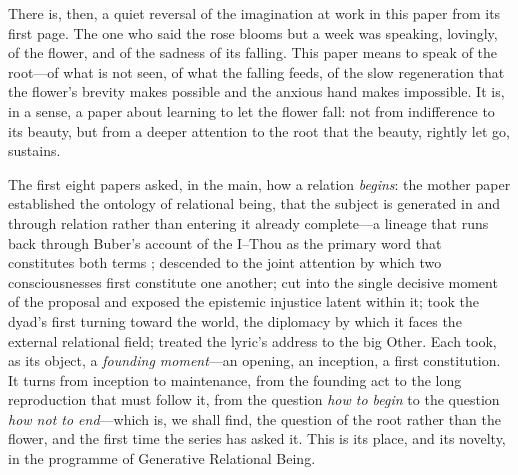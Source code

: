 There is, then, a quiet reversal of the imagination at work in this paper from its first page. The one who said the rose blooms but a week was speaking, lovingly, of the flower, and of the sadness of its falling. This paper means to speak of the root---of what is not seen, of what the falling feeds, of the slow regeneration that the flower's brevity makes possible and the anxious hand makes impossible. It is, in a sense, a paper about learning to let the flower fall: not from indifference to its beauty, but from a deeper attention to the root that the beauty, rightly let go, sustains.

 The first eight papers asked, in the main, how a relation \emph{begins}: the mother paper established the ontology of relational being, that the subject is generated in and through relation rather than entering it already complete---a lineage that runs back through Buber's account of the I--Thou as the primary word that constitutes both terms \parencite{buber1970};  descended to the joint attention by which two consciousnesses first constitute one another;  cut into the single decisive moment of the proposal and exposed the epistemic injustice latent within it;  took the dyad's first turning toward the world, the diplomacy by which it faces the external relational field;  treated the lyric's address to the big Other. Each took, as its object, a \emph{founding moment}---an opening, an inception, a first constitution.  It turns from inception to maintenance, from the founding act to the long reproduction that must follow it, from the question \emph{how to begin} to the question \emph{how not to end}---which is, we shall find, the question of the root rather than the flower, and the first time the series has asked it. This is its place, and its novelty, in the programme of Generative Relational Being.

